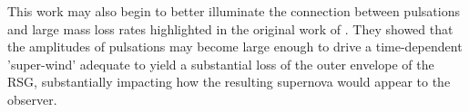 This work may also begin to better illuminate the connection between
pulsations and large mass loss rates highlighted in the original work of \citet{Yoon_2010}. 
They showed that the amplitudes of pulsations may become large enough to drive a time-dependent
'super-wind' adequate to yield a substantial loss of the outer envelope of the RSG, substantially impacting how the resulting supernova would appear to the observer. 